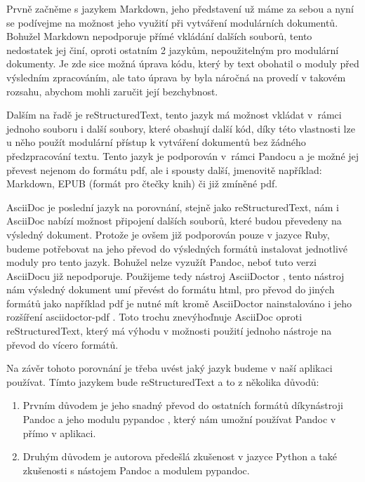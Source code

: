 Prvně začněme s jazykem Markdown, jeho představení už máme za sebou a nyní se podívejme na možnost jeho využití při vytváření modulárních dokumentů. Bohužel
Markdown nepodporuje přímé vkládání dalších souborů, tento nedostatek jej činí, oproti ostatním 2 jazykům, nepoužitelným pro modulární dokumenty. Je zde sice možná úprava
kódu, který by text obohatil o moduly před výsledním zpracováním, ale tato úprava by byla náročná na provedí v takovém rozsahu, abychom mohli zaručit její bezchybnost.

Dalším na řadě je reStructuredText, tento jazyk má možnost vkládat v~rámci jednoho souboru i další soubory, které obashují další kód, díky této vlastnosti
lze u něho použít modulární přístup k vytváření dokumentů bez žádného předzpracování textu. Tento jazyk je podporován v~rámci Pandocu \cite{pandocSW} a je možné
jej převest nejenom do formátu \gls{pdf}, ale i spousty další, jmenovitě například: Markdown, EPUB (formát pro čtečky knih) či již zmíněné \gls{pdf}.

AsciiDoc je poslední jazyk na porovnání, stejně jako reStructuredText, nám i AsciiDoc nabízí možnost připojení dalších souborů, které budou převe\-deny na výsledný dokument.
Protože je ovšem již podporován pouze v jazyce Ruby, budeme potřebovat na jeho převod do výsledných formátů instalovat jednotlivé moduly pro tento jazyk. Bohužel nelze
vyzužít Pandoc, neboť tuto verzi AsciiDocu již nepodporuje. Použijeme tedy nástroj AsciiDoctor \cite{asciiDoctorSW}, tento nástroj nám výsledný dokument umí převést do
formátu \gls{html}, pro převod do jiných formátů jako například \gls{pdf} je nutné mít kromě AsciiDoctor nainstalováno i jeho rozšíření asciidoctor-pdf \cite{asciidoctorpdfSW}.
Toto trochu znevýhoďnuje AsciiDoc oproti reStructuredText, který má výhodu v možnosti použití jednoho nástroje na převod do vícero formátů.

Na závěr tohoto porovnání je třeba uvést jaký jazyk budeme v naší aplikaci používat. Tímto jazykem bude reStructuredText a to z několika důvodů:
\begin{enumerate}
    \item Prvním důvodem je jeho snadný převod do ostatních formátů díky\linebreak nástroji Pandoc \cite{pandocSW} a jeho modulu pypandoc \cite{pypandocSW}, který nám umožní používat Pandoc v přímo v aplikaci.
    \item Druhým důvodem je autorova předešlá zkušenost v jazyce Python a také zkušenosti s nástojem Pandoc a modulem pypandoc.
\end{enumerate}

